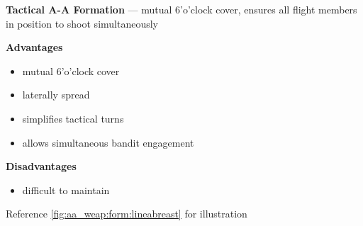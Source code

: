 
        




\begin{tcoloritemize}
    \textbf{Tactical A-A Formation} --- mutual 6'o'clock cover, ensures all flight members in position to shoot simultaneously
    \medskip

    \textbf{Advantages}
    \begin{itemize}
        \item mutual 6'o'clock cover
        \item laterally spread
        \item simplifies tactical turns
        \item allows simultaneous bandit engagement
    \end{itemize}

    \textbf{Disadvantages}
    \begin{itemize}
        \item difficult to maintain
    \end{itemize}

    Reference \cref{fig:aa_weap:form:lineabreast} for illustration
\end{tcoloritemize}

